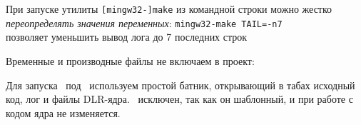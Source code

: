 \bigskip
При запуске утилиты \verb|[mingw32-]make| из командной строки можно
жестко \emph{переопределять значения переменных}:
\verb|mingw32-make TAIL=-n7|\\
позволяет уменьшить вывод лога до 7 последних строк

\bigskip
Временные и производные файлы не включаем в проект:

Для запуска \gvim\ под \win\ используем простой батник, открывающий в табах
исходный код, лог и файлы DLR-ядра. \ исключен, так как он
шаблонный, и при работе с кодом ядра не изменяется.
 

